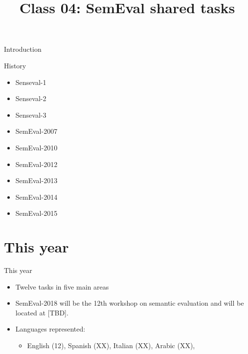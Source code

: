 \documentclass[10pt, compress]{beamer}
\title{Class 04: SemEval shared tasks}
\begin{document}
\maketitle


\begin{frame}{Introduction}


\end{frame}


\begin{frame}{History}

\begin{itemize}
  \item Senseval-1
  \item Senseval-2
  \item Senseval-3
  \item SemEval-2007
  \item SemEval-2010
  \item SemEval-2012
  \item SemEval-2013
  \item SemEval-2014
  \item SemEval-2015
\end{itemize}

\end{frame}



\section{This year}

\begin{frame}{This year}

\begin{itemize}
  \item Twelve tasks in five main areas
  \item SemEval-2018 will be the 12th workshop on semantic evaluation and will be located at [TBD]. 
  \item Languages represented:
  \begin{itemize} 
    \item English (12), Spanish (XX), Italian (XX), Arabic (XX), 
  \end{itemize}
\end{itemize}

\end{frame}
\end{document}
